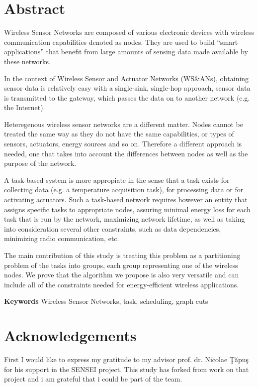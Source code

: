 \chapter*{Abstract}

Wireless Sensor Networks are composed of various electronic devices with wireless communication capabilities denoted as nodes. They 
are used to build ``smart applications'' that benefit from large amounts of sensing data made available by these networks.

In the context of Wireless Sensor and Actuator Networks (WS\&ANs), obtaining sensor data is relatively easy with a
single-sink, single-hop approach, sensor data is transmitted to the gateway, which passes the data on to another network
(e.g. the Internet).

Heteregenous wireless sensor networks are a different matter. Nodes cannot be treated the same way as they do not
have the same capabilities, or types of sensors, actuators, energy sources and so on. Therefore a different approach is
needed, one that takes into account the differences between nodes as well as the purpose of the network.

A task-based system is more appropiate in the sense that a task exists for collecting data (e.g. a temperature
acquisition task), for processing data or for activating actuators. Such a task-based network requires however an entity
that assigns specific tasks to appropriate nodes, assuring minimal energy loss for each task that is run by the network,
maximizing network lifetime, as well as taking into consideration several other constraints, such as data dependencies,
minimizing radio communication, etc. 

The main contribution of this study is treating this problem as a partitioning problem of the tasks into groups, each group
representing one of the wireless nodes. We prove that the algorithm we propose is also very versatile and can include 
all of the constraints needed for energy-efficient wireless applications.

\textbf{Keywords} Wireless Sensor Networks, task, scheduling, graph cuts

\chapter*{Acknowledgements}

First I would like to express my gratitude to my advisor prof. dr. Nicolae \c{T}\u{a}pu\c{s} for his support in the SENSEI project.
This study has forked from work on that project and i am grateful that i could be part of the team.

